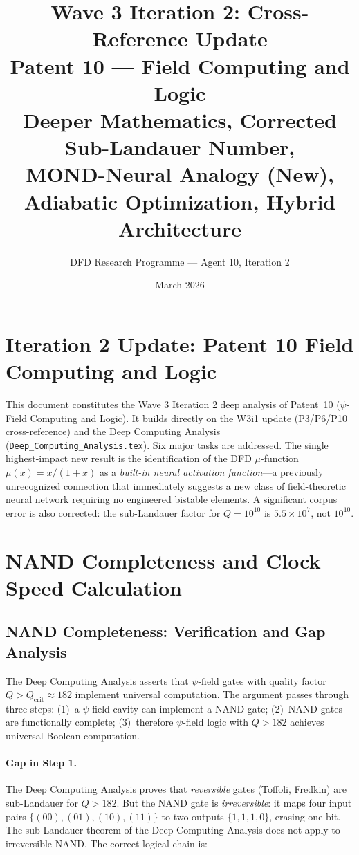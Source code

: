 \documentclass[11pt]{article}
\title{\textbf{Wave 3 Iteration 2: Cross-Reference Update}\\[6pt]
Patent 10 --- Field Computing and Logic\\[4pt]
{\normalsize Deeper Mathematics, Corrected Sub-Landauer Number,}\\
{\normalsize MOND-Neural Analogy (New), Adiabatic Optimization, Hybrid Architecture}}
\author{DFD Research Programme --- Agent 10, Iteration 2}
\date{March 2026}
\theoremstyle{definition}
\theoremstyle{remark}
\begin{document}
\maketitle
\tableofcontents
\newpage

\section{Iteration 2 Update: Patent 10 Field Computing and Logic}

This document constitutes the Wave 3 Iteration 2 deep analysis of Patent~10
($\psi$-Field Computing and Logic). It builds directly on the W3i1 update
(P3/P6/P10 cross-reference) and the Deep Computing Analysis
(\texttt{Deep\_Computing\_Analysis.tex}). Six major tasks are addressed.
The single highest-impact new result is the identification of the DFD
$\mu$-function $\mu(x) = x/(1+x)$ as a \emph{built-in neural activation
function}---a previously unrecognized connection that immediately suggests
a new class of field-theoretic neural network requiring no engineered
bistable elements. A significant corpus error is also corrected: the
sub-Landauer factor for $Q = 10^{10}$ is $5.5 \times 10^7$, not $10^{10}$.

\section{NAND Completeness and Clock Speed Calculation}
\label{sec:nand_clock}

\subsection{NAND Completeness: Verification and Gap Analysis}

The Deep Computing Analysis asserts that $\psi$-field gates with quality
factor $Q > Q_{\mathrm{crit}} \approx 182$ implement universal computation.
The argument passes through three steps: (1)~a $\psi$-field cavity can
implement a NAND gate; (2)~NAND gates are functionally complete; (3)~therefore
$\psi$-field logic with $Q > 182$ achieves universal Boolean computation.

\paragraph{Gap in Step 1.}
The Deep Computing Analysis proves that \emph{reversible} gates (Toffoli,
Fredkin) are sub-Landauer for $Q > 182$. But the NAND gate is
\emph{irreversible}: it maps four input pairs $\{(00),(01),(10),(11)\}$
to two outputs $\{1,1,1,0\}$, erasing one bit. The sub-Landauer theorem
of the Deep Computing Analysis does not apply to irreversible NAND. The
correct logical chain is:
\end{document}
